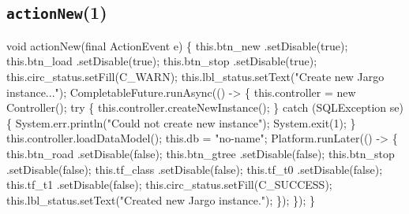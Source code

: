 \subsection{\texttt{actionNew}(1)}
\nwenddocs{}\endmoddef{}
void actionNew(final ActionEvent e) \{
  this.btn_new      .setDisable(true);
  this.btn_load     .setDisable(true);
  this.btn_stop     .setDisable(true);
  this.circ_status.setFill(C_WARN);
  this.lbl_status.setText("Create new Jargo instance...");
  CompletableFuture.runAsync(() -> \{
    this.controller = new Controller();
    try \{
      this.controller.createNewInstance();
    \} catch (SQLException se) \{
      System.err.println("Could not create new instance");
      System.exit(1);
    \}
    this.controller.loadDataModel();
    this.db = "no-name";
    Platform.runLater(() -> \{
      this.btn_road     .setDisable(false);
      this.btn_gtree    .setDisable(false);
      this.btn_stop     .setDisable(false);
      this.tf_class     .setDisable(false);
      this.tf_t0        .setDisable(false);
      this.tf_t1        .setDisable(false);
      this.circ_status.setFill(C_SUCCESS);
      this.lbl_status.setText("Created new Jargo instance.");
    \});
  \});
\}
\eatline
{}\nwendcode{}\nwdocspar
